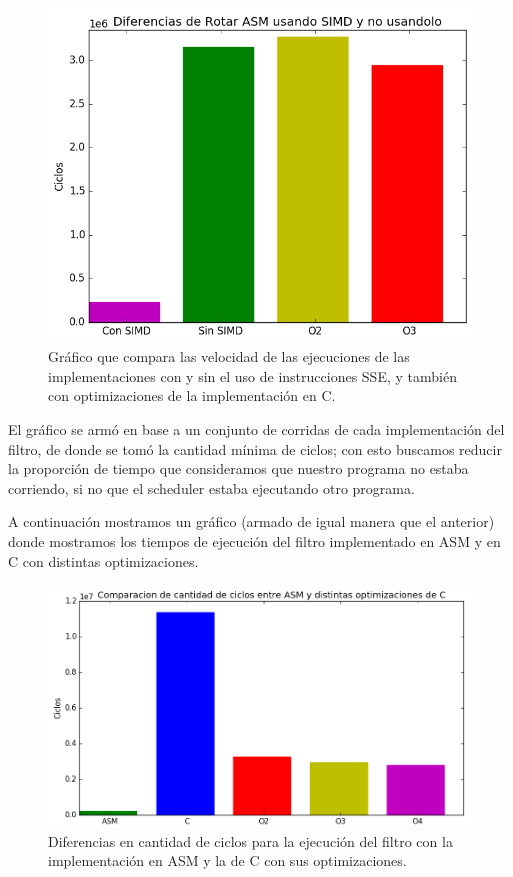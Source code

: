\begin{figure}[H]
\centering
\captionsetup{justification=centering}
	\includegraphics[width = 12 cm, height = 8 cm]{imagenes/SinSIMD.png}
\caption[center]{Gráfico que compara las velocidad de las ejecuciones de las implementaciones con y sin el uso de instrucciones SSE, y también con optimizaciones de la implementación en C.}
\end{figure}

\par{El gráfico se armó en base a un conjunto de corridas de cada implementación del filtro, de donde se tomó la cantidad mínima de ciclos; con esto buscamos reducir la proporción de tiempo que consideramos que nuestro programa no estaba corriendo, si no que el scheduler estaba ejecutando otro programa.}\\
\par{A continuación mostramos un gráfico (armado de igual manera que el anterior) donde mostramos los tiempos de ejecución del filtro implementado en ASM y en C con distintas optimizaciones.}
	
\begin{figure}[H]
\centering
\captionsetup{justification=centering}
\includegraphics[width = 13 cm, height = 8 cm]{imagenes/rotarConC.png}
\caption[center]{Diferencias en cantidad de ciclos para la ejecución del filtro con la implementación en ASM y la de C con sus optimizaciones.}
\end{figure}